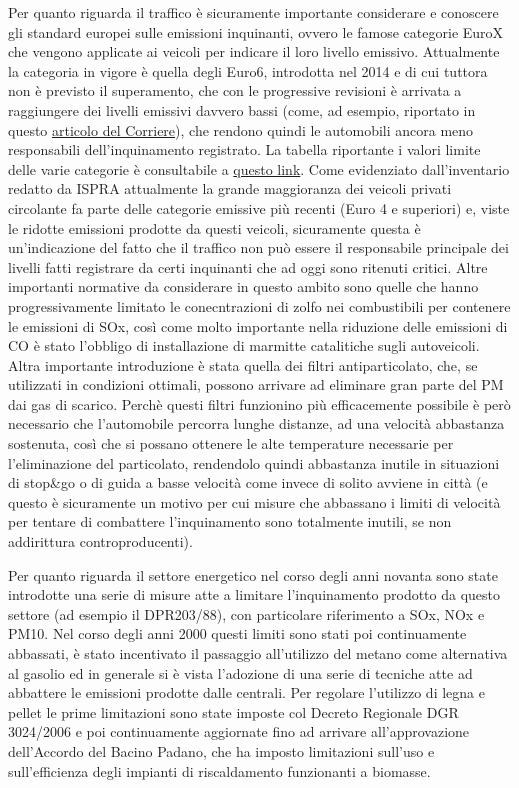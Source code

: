 \documentclass{article}
\begin{document}
Per quanto riguarda il traffico è sicuramente importante considerare e conoscere gli standard europei sulle emissioni inquinanti, ovvero le famose categorie EuroX che vengono applicate ai veicoli per indicare il loro livello emissivo. Attualmente la categoria in vigore è quella degli Euro6, introdotta nel 2014 e di cui tuttora non è previsto il superamento, che con le progressive revisioni è arrivata a raggiungere dei livelli emissivi davvero bassi (come, ad esempio, riportato in questo \href{https://motori.corriere.it/motori/attualita/20_aprile_27/sorpresa-diesel-non-inquina-quasi-piu-ma-restano-pregiudizi-0003501e-886a-11ea-96e3-c7b28bb4a705.shtml}{articolo del Corriere}), che rendono quindi le automobili ancora meno responsabili dell'inquinamento registrato. La tabella riportante i valori limite delle varie categorie è consultabile a \href{https://en.wikipedia.org/wiki/European_emission_standards}{questo link}. Come evidenziato dall'inventario redatto da ISPRA\cite{iir2020} attualmente la grande maggioranza dei veicoli privati circolante fa parte delle categorie emissive più recenti (Euro 4 e superiori) e, viste le ridotte emissioni prodotte da questi veicoli, sicuramente questa è un'indicazione del fatto che il traffico non può essere il responsabile principale dei livelli fatti registrare da certi inquinanti che ad oggi sono ritenuti critici. 
Altre importanti normative da considerare in questo ambito sono quelle che hanno progressivamente limitato le conecntrazioni di zolfo nei combustibili per contenere le emissioni di SOx, così come molto importante nella riduzione delle emissioni di CO è stato l'obbligo di installazione di marmitte catalitiche sugli autoveicoli. Altra importante introduzione è stata quella dei filtri antiparticolato, che, se utilizzati in condizioni ottimali, possono arrivare ad eliminare gran parte del PM dai gas di scarico. Perchè questi filtri funzionino più efficacemente possibile è però necessario che l'automobile percorra lunghe distanze, ad una velocità abbastanza sostenuta, così che si possano ottenere le alte temperature necessarie per l'eliminazione del particolato, rendendolo quindi abbastanza inutile in situazioni di stop\&go o di guida a basse velocità come invece di solito avviene in città (e questo è sicuramente un motivo per cui misure che abbassano i limiti di velocità per tentare di combattere l'inquinamento sono totalmente inutili, se non addirittura controproducenti).

Per quanto riguarda il settore energetico nel corso degli anni novanta sono state introdotte una serie di misure atte a limitare l'inquinamento prodotto da questo settore (ad esempio il DPR203/88), con particolare riferimento a SOx, NOx e PM10. Nel corso degli anni 2000 questi limiti sono stati poi continuamente abbassati, è stato incentivato il passaggio all'utilizzo del metano come alternativa al gasolio ed in generale si è vista l'adozione di una serie di tecniche atte ad abbattere le emissioni prodotte dalle centrali. 
Per regolare l'utilizzo di legna e pellet le prime limitazioni sono state imposte col Decreto Regionale DGR 3024/2006 e poi continuamente aggiornate fino ad arrivare all'approvazione dell'Accordo del Bacino Padano, che ha imposto limitazioni sull'uso e sull'efficienza degli impianti di riscaldamento funzionanti a biomasse.
\end{document}
